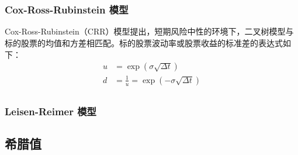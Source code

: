 \chapter{}
\section{}
\subsection{Cox-Ross-Rubinstein 模型}
Cox-Ross-Rubinstein（CRR）模型提出，短期风险中性的环境下，二叉树模型与标的股票的均值和方差相匹配。标的股票波动率或股票收益的标准差的表达式如下：
\begin{equation}
    \begin{aligned}
        u & =\exp(\sigma \sqrt{\Delta t})               \\
        d & = \frac{1}{u}=\exp(-\sigma \sqrt{\Delta t}) \\
    \end{aligned}
\end{equation}

\subsection{Leisen-Reimer 模型}

\section{希腊值}